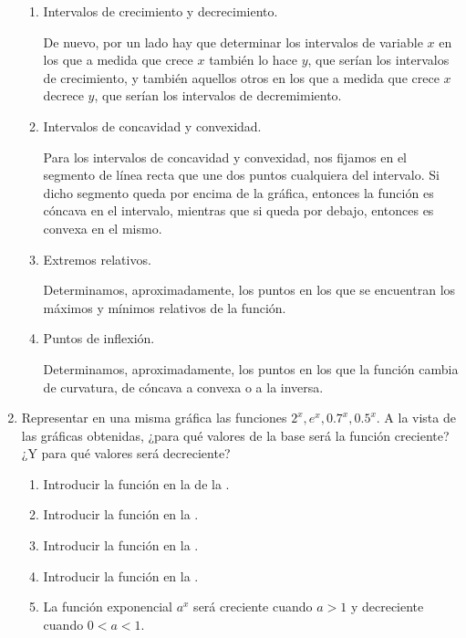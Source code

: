 \begin{enumerate}[leftmargin=*]
\begin{enumerate}
      \item  Intervalos de crecimiento y decrecimiento.
            \begin{indication}
            De nuevo, por un lado hay que determinar los intervalos de variable $x$ en los que a medida que crece $x$ también lo hace $y$, que serían
            los intervalos de crecimiento, y también aquellos otros en los que a medida que crece $x$ decrece $y$, que serían los intervalos de
            decremimiento.
            \end{indication}

      \item Intervalos de concavidad y convexidad.
            \begin{indication}
            Para los intervalos de concavidad y convexidad, nos fijamos en el segmento de línea recta que une dos puntos cualquiera del intervalo. Si
            dicho segmento queda por encima de la gráfica, entonces la función es cóncava en el intervalo, mientras que si queda por debajo, entonces es
            convexa en el mismo.
            \end{indication}

      \item Extremos relativos.
            \begin{indication}
            Determinamos, aproximadamente, los puntos en los que se encuentran los máximos y mínimos relativos de la función.
            \end{indication}

      \item Puntos de inflexión.
            \begin{indication}
            Determinamos, aproximadamente, los puntos en los que la función cambia de curvatura, de cóncava a convexa o a la inversa.
            \end{indication}
      \end{enumerate}

\item Representar en una misma gráfica las funciones $2^{x}, e^{x}, 0.7^{x}, 0.5^{x}$.
      A la vista de las gráficas obtenidas, ¿para qué valores de la base será la función creciente? ¿Y para qué valores será decreciente?
      \begin{indication}
      \begin{enumerate}
      \item Introducir la función  en la  de la .
      \item Introducir la función  en la .
      \item Introducir la función  en la .
      \item Introducir la función  en la .
      \item La función exponencial $a^x$ será creciente cuando $a>1$ y decreciente cuando $0<a<1$.
      \end{enumerate}
      \end{indication}


\end{enumerate}
